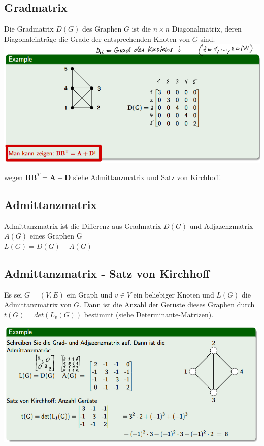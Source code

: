 \documentclass[12pt]{scrartcl}
\begin{document}
\newpage
\subsection{Gradmatrix}
Die Gradmatrix $D(G)$ des Graphen $G$ ist die $n \times n$ Diagonalmatrix, deren 
Diagonaleinträge die Grade der entsprechenden Knoten von $G$ sind.\\

\includegraphics[width=14cm]{img/Gradmatrix.png}

wegen $\mathbf{BB}^T = \mathbf{A + D}$ siehe Admittanzmatrix und Satz von Kirchhoff.

\subsection{Admittanzmatrix}
Admittanzmatrix ist die Differenz aus Gradmatrix $D(G)$ und Adjazenzmatrix $A(G)$ eines Graphen G\\
$L(G) = D(G) - A(G)$



\subsection{Admittanzmatrix - Satz von Kirchhoff}
Es sei $G = (V,E)$ ein Graph und $v \in V$ ein beliebiger Knoten und $L(G)$
die Admittanzmatrix von $G$. Dann ist die Anzahl der Gerüste dieses Graphen durch
$t(G) = det(L_v(G))$ bestimmt (siehe Determinante-Matrizen).\\

\begin{center}
\includegraphics[height=6cm]{img/kirchhoff.png}
\end{center}
\end{document}
